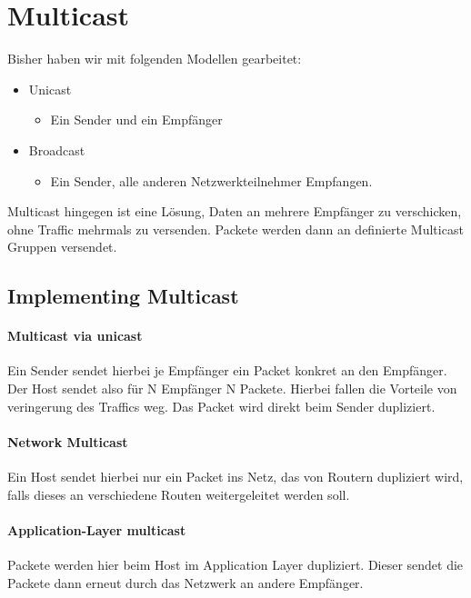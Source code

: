 \section{Multicast}
	Bisher haben wir mit folgenden Modellen gearbeitet:
	\begin{itemize}
		\item Unicast
			\begin{itemize}
				\item Ein Sender und ein Empfänger
			\end{itemize}
		\item Broadcast
			\begin{itemize}
				\item Ein Sender, alle anderen Netzwerkteilnehmer Empfangen. 
			\end{itemize}
	\end{itemize}

	Multicast hingegen ist eine Lösung, Daten an mehrere Empfänger zu verschicken, ohne Traffic mehrmals zu versenden. Packete werden dann an definierte Multicast Gruppen versendet. 
	
	\subsection{Implementing Multicast}
		\paragraph{Multicast via unicast}
			Ein Sender sendet hierbei je Empfänger ein Packet konkret an den Empfänger. Der Host sendet also für N Empfänger N Packete. Hierbei fallen die Vorteile von veringerung des Traffics weg. Das Packet wird direkt beim Sender dupliziert.

		\paragraph{Network Multicast}
			Ein Host sendet hierbei nur ein Packet ins Netz, das von Routern dupliziert wird, falls dieses an verschiedene Routen weitergeleitet werden soll.

		\paragraph{Application-Layer multicast}
			Packete werden hier beim Host im Application Layer dupliziert. Dieser sendet die Packete dann erneut durch das Netzwerk an andere Empfänger. 

